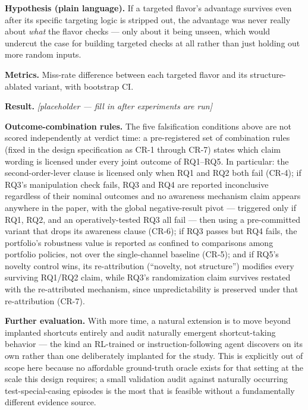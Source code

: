 \documentclass[11pt]{article}
\newcommand{\ph}{\textit{[placeholder --- fill in after experiments are run]}}
\begin{document}
\textbf{Hypothesis (plain language).} If a targeted flavor's advantage survives even after its specific targeting logic is stripped out, the advantage was never really about \emph{what} the flavor checks --- only about it being unseen, which would undercut the case for building targeted checks at all rather than just holding out more random inputs.

\textbf{Metrics.} Miss-rate difference between each targeted flavor and its structure-ablated variant, with bootstrap CI.

\textbf{Result.} \ph

\vspace{0.5em}
\noindent\textbf{Outcome-combination rules.} The five falsification conditions above are not scored independently at verdict time: a pre-registered set of combination rules (fixed in the design specification as CR-1 through CR-7) states which claim wording is licensed under every joint outcome of RQ1--RQ5. In particular: the second-order-lever clause is licensed only when RQ1 and RQ2 both fail (CR-4); if RQ3's manipulation check fails, RQ3 and RQ4 are reported inconclusive regardless of their nominal outcomes and no awareness mechanism claim appears anywhere in the paper, with the global negative-result pivot --- triggered only if RQ1, RQ2, and an operatively-tested RQ3 all fail --- then using a pre-committed variant that drops its awareness clause (CR-6); if RQ3 passes but RQ4 fails, the portfolio's robustness value is reported as confined to comparisons among portfolio policies, not over the single-channel baseline (CR-5); and if RQ5's novelty control wins, its re-attribution (``novelty, not structure'') modifies every surviving RQ1/RQ2 claim, while RQ3's randomization claim survives restated with the re-attributed mechanism, since unpredictability is preserved under that re-attribution (CR-7).

\vspace{0.5em}
\noindent\textbf{Further evaluation.} With more time, a natural extension is to move beyond implanted shortcuts entirely and audit naturally emergent shortcut-taking behavior --- the kind an RL-trained or instruction-following agent discovers on its own rather than one deliberately implanted for the study. This is explicitly out of scope here because no affordable ground-truth oracle exists for that setting at the scale this design requires; a small validation audit against naturally occurring test-special-casing episodes is the most that is feasible without a fundamentally different evidence source.
\end{document}
